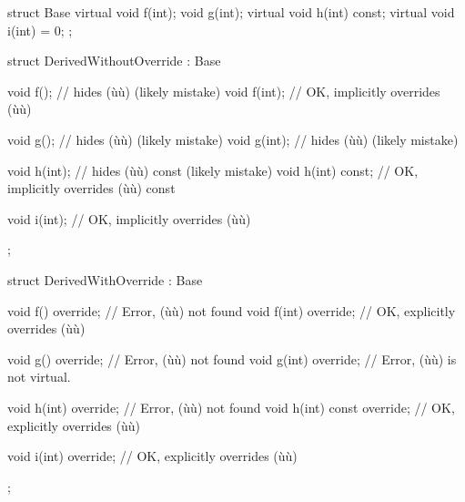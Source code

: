 %
%
%
%
\begin{emcppslisting}
struct Base
{
    virtual void f(int);
            void g(int);
    virtual void h(int) const;
    virtual void i(int) = 0;
};

struct DerivedWithoutOverride : Base
{
    void f();             // hides (ù{}ù) (likely mistake)
    void f(int);          // OK, implicitly overrides (ù{}ù)

    void g();             // hides (ù{}ù) (likely mistake)
    void g(int);          // hides (ù{}ù) (likely mistake)

    void h(int);          // hides (ù{}ù) const (likely mistake)
    void h(int) const;    // OK, implicitly overrides (ù{}ù) const

    void i(int);          // OK, implicitly overrides (ù{}ù)
};

struct DerivedWithOverride : Base
{
    void f()          override;    // Error, (ù{}ù) not found
    void f(int)       override;    // OK, explicitly overrides (ù{}ù)

    void g()          override;    // Error, (ù{}ù) not found
    void g(int)       override;    // Error, (ù{}ù) is not virtual.

    void h(int)       override;    // Error, (ù{}ù) not found
    void h(int) const override;    // OK, explicitly overrides (ù{}ù)

    void i(int)       override;    // OK, explicitly overrides (ù{}ù)
};
\end{emcppslisting}

